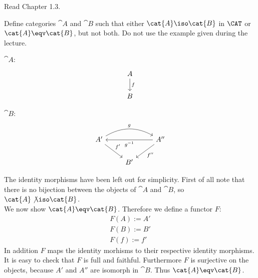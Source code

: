 \def\pathToRoot{../../}



\author{Joachim Bard, Maximilian Wuttke, Nikita Ziuzin}


\begin{hint}
  Read Chapter 1.3.
\end{hint}

\begin{exercise}
  Define categories $\cat{A}$ and $\cat{B}$ such that either $\cat{A} \iso \cat{B}$ in $\CAT$ or $\cat{A} \eqv \cat{B}$, but not both.
  Do not use the example given during the lecture.
\end{exercise}
\begin{answer}
    \begin{minipage}{0.5\textwidth}
        $\cat{A}$:
        \[
            \begin{tikzcd}
                A \arrow{d}{f}\\
                B
            \end{tikzcd}
        \]
    \end{minipage}
    \begin{minipage}{0.5\textwidth}
        $\cat{B}$:
        \[
            \begin{tikzcd}
                A' \arrow{dr}{f'} \arrow[bend left]{rr}{g} &    & A'' \arrow{dl}{f''} \arrow{ll}{g^{-1}} \\
                                                           & B' &
            \end{tikzcd}
        \]
    \end{minipage}
    The identity morphisms have been left out for simplicity.
    First of all note that there is no bijection between the objects of $\cat{A}$ and $\cat{B}$, so $\cat{A} \not\iso \cat{B}$.\\
    We now show $\cat{A} \eqv \cat{B}$.
    Therefore we define a functor $F$:
    \begin{align*}
        F(A) := A'\\
        F(B) := B'\\
        F(f) := f'
    \end{align*}
    In addition $F$ maps the identity morhisms to their respective identity morphisms.
    It is easy to check that $F$ is full and faithful.
    Furthermore $F$ is surjective on the objects, because $A'$ and $A''$ are isomorph in $\cat{B}$.
    Thus $\cat{A} \eqv \cat{B}$.
\end{answer}

